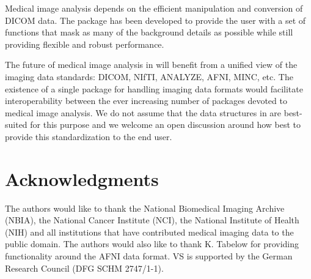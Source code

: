\documentclass[
]{article}
\begin{document}
Medical image analysis depends on the efficient manipulation and
conversion of DICOM data. The  package has been developed
to provide the user with a set of functions that mask as many of the
background details as possible while still providing flexible and robust
performance.

The future of medical image analysis in  will benefit from a
unified view of the imaging data standards: DICOM, NIfTI, ANALYZE, AFNI,
MINC, etc. The existence of a single package for handling imaging data
formats would facilitate interoperability between the ever increasing
number of  packages devoted to medical image analysis. We do
not assume that the data structures in  are best-suited
for this purpose and we welcome an open discussion around how best to
provide this standardization to the end user.

\section*{Acknowledgments}

The authors would like to thank the National Biomedical Imaging Archive
(NBIA), the National Cancer Institute (NCI), the National Institute of
Health (NIH) and all institutions that have contributed medical imaging
data to the public domain. The authors would also like to thank K.
Tabelow for providing functionality around the AFNI data format. VS is
supported by the German Research Council (DFG SCHM 2747/1-1).


\end{document}
